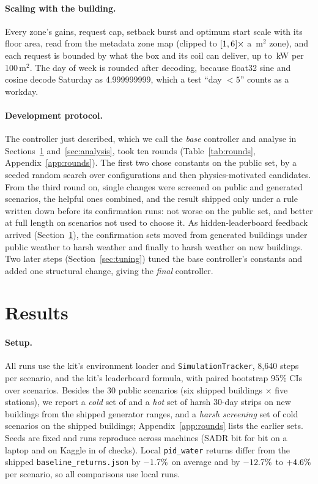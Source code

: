 \documentclass{article}
\begin{document}
\paragraph{Scaling with the building.} Every zone's gains, request cap, setback burst and optimum start scale with its floor area, read from the metadata zone map (clipped to $[1, 6]\times$ a \ParAreaRef\,m$^2$ zone), and each request is bounded by what the box and its coil can deliver, up to \RFiveParQcapKw\,kW per 100\,m$^2$. The day of week is rounded after decoding, because float32 sine and cosine decode Saturday as 4.999999999, which a test ``day $<5$'' counts as a workday.

\paragraph{Development protocol.} The controller just described, which we call the \emph{base} controller and analyse in Sections~\ref{sec:results} and~\ref{sec:analysis}, took ten rounds (Table~\ref{tab:rounds}, Appendix~\ref{app:rounds}). The first two chose constants on the public set, by a seeded random search over \NTuneConfigs{} configurations and then \NCandV{} physics-motivated candidates. From the third round on, single changes were screened on public and generated scenarios, the helpful ones combined, and the result shipped only under a rule written down before its confirmation runs: not worse on the public set, and better at full length on scenarios not used to choose it. As hidden-leaderboard feedback arrived (Section~\ref{sec:results}), the confirmation sets moved from generated buildings under public weather to harsh weather and finally to harsh weather on new buildings. Two later steps (Section~\ref{sec:tuning}) tuned the base controller's constants and added one structural change, giving the \emph{final} controller.

\section{Results}
\label{sec:results}

\paragraph{Setup.} All runs use the kit's environment loader and \texttt{SimulationTracker}, 8,640 steps per scenario, and the kit's leaderboard formula, with paired bootstrap 95\% CIs over scenarios. Besides the 30 public scenarios (six shipped buildings $\times$ five stations), we report a \emph{cold} set of \RTenConfHarshCThreeN{} and a \emph{hot} set of \RTenConfHotHN{} harsh 30-day strips on \RTenNNewBuild{} new buildings from the shipped generator ranges, and a \emph{harsh screening} set of \RSixHarshSN{} cold scenarios on the shipped buildings; Appendix~\ref{app:rounds} lists the earlier sets. Seeds are fixed and runs reproduce across machines (SADR bit for bit on a laptop and on Kaggle in \RSixReproIdentical{} of \RSixReproN{} checks). Local \texttt{pid\_water} returns differ from the shipped \texttt{baseline\_returns.json} by $-1.7\%$ on average and by $-12.7\%$ to $+4.6\%$ per scenario, so all comparisons use local runs.
\end{document}
